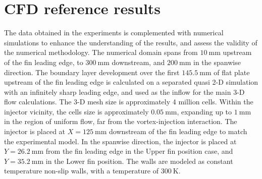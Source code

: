 \documentclass{AIAA}
\begin{document}
\section{CFD reference results}
\label{sec:CFDReferenceRes}

The data obtained in the experiments is complemented with numerical simulations to enhance the understanding of the results, and assess the validity of the numerical methodology.
The numerical domain spans from $\SI{10}{\milli\meter}$ upstream of the fin leading edge, to $\SI{300}{\milli\meter}$ downstream, and $\SI{200}{\milli\meter}$ in the spanwise direction. The boundary layer development over the first $\SI{145.5}{\milli\meter}$ of flat plate upstream of the fin leading edge is calculated on a separated quasi 2-D simulation with an infinitely sharp leading edge, and used as the inflow for the main 3-D flow calculations.
The 3-D mesh size is approximately 4 million cells. Within the injector vicinity, the cells size is approximately $\SI{0.05}{\milli\meter}$, expanding up to $\SI{1}{\milli\meter}$ in the region of uniform flow, far from the vortex-injection interaction. The injector is placed at $X=\SI{125}{\milli\meter}$ downstream of the fin leading edge to match the experimental model. In the spanwise direction, the injector is placed at $Y=\SI{26.2}{\milli\meter}$ from the fin leading edge in the Upper fin position case, and $Y=\SI{35.2}{\milli\meter}$ in the Lower fin position.
The walls are modeled as constant temperature non-slip walls, with a temperature of $\SI{300}{\kelvin}$. 
\end{document}
